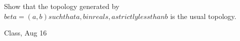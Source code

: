 \begin{samepage}
\begin{ex}
Show that the topology generated by $beta = {{ (a,b) such that a,b in reals, a strictly less than b }}$ is the usual topology.
\end{ex}
\begin{source}
Class, Aug 16
\end{source}
\end{samepage}
